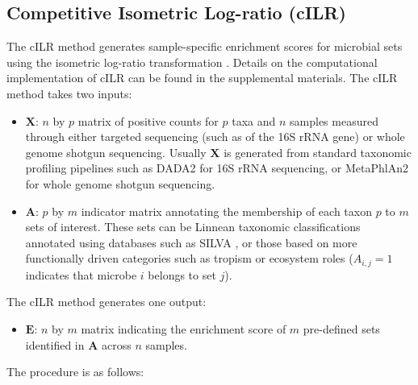 \documentclass{article}
\begin{document}
\subsection*{Competitive Isometric Log-ratio (cILR)}
The cILR method generates sample-specific enrichment scores for microbial sets using the isometric log-ratio transformation \cite{egozcue2003}. Details on the computational implementation of cILR can be found in the supplemental materials. The cILR method takes two inputs:  
\begin{itemize}
    \item $\mathbf{X}$: $n$ by $p$ matrix of positive counts for $p$ taxa and $n$ samples measured through either targeted sequencing (such as of the 16S rRNA gene) or whole genome shotgun sequencing. Usually $\mathbf{X}$ is generated from standard taxonomic profiling pipelines such as DADA2 \cite{callahan2016} for 16S rRNA sequencing, or MetaPhlAn2 \cite{truong2015} for whole genome shotgun sequencing. 
    \item $\mathbf{A}$: $p$ by $m$ indicator matrix annotating the membership of each taxon $p$ to $m$ sets of interest. These sets can be Linnean taxonomic classifications annotated using databases such as SILVA \cite{quast2013}, or those based on more functionally driven categories such as tropism or ecosystem roles ($A_{i,j} = 1$ indicates that microbe $i$ belongs to set $j$). 
\end{itemize}
The cILR method generates one output:  
\begin{itemize} 
    \item $\mathbf{E}$: $n$ by $m$ matrix indicating the enrichment score of $m$ pre-defined sets identified in $\mathbf{A}$ across $n$ samples. 
\end{itemize}
The procedure is as follows:  
\end{document}
